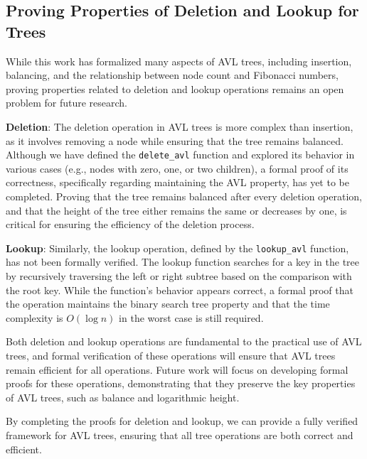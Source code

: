\subsection*{Proving Properties of Deletion and Lookup for Trees}

While this work has formalized many aspects of AVL trees, including insertion, balancing, and the relationship between node count and Fibonacci numbers, proving properties related to deletion and lookup operations remains an open problem for future research.

\textbf{Deletion}: The deletion operation in AVL trees is more complex than insertion, as it involves removing a node while ensuring that the tree remains balanced. Although we have defined the \texttt{delete\_avl} function and explored its behavior in various cases (e.g., nodes with zero, one, or two children), a formal proof of its correctness, specifically regarding maintaining the AVL property, has yet to be completed. Proving that the tree remains balanced after every deletion operation, and that the height of the tree either remains the same or decreases by one, is critical for ensuring the efficiency of the deletion process.

\textbf{Lookup}: Similarly, the lookup operation, defined by the \texttt{lookup\_avl} function, has not been formally verified. The lookup function searches for a key in the tree by recursively traversing the left or right subtree based on the comparison with the root key. While the function’s behavior appears correct, a formal proof that the operation maintains the binary search tree property and that the time complexity is \( O(\log n) \) in the worst case is still required.

Both deletion and lookup operations are fundamental to the practical use of AVL trees, and formal verification of these operations will ensure that AVL trees remain efficient for all operations. Future work will focus on developing formal proofs for these operations, demonstrating that they preserve the key properties of AVL trees, such as balance and logarithmic height.

By completing the proofs for deletion and lookup, we can provide a fully verified framework for AVL trees, ensuring that all tree operations are both correct and efficient.

